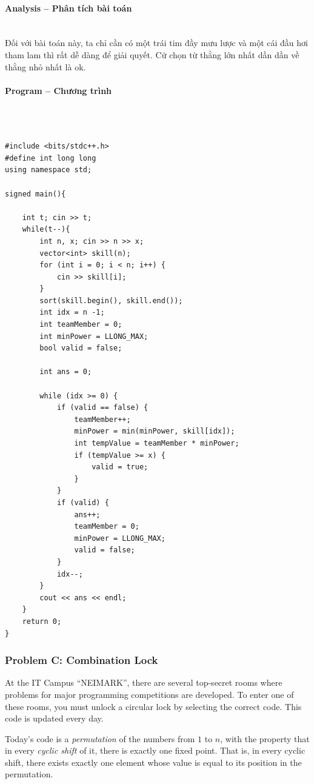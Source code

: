\documentclass{article}
\begin{document}
\paragraph{Analysis -- Phân tích bài toán} \mbox{} \\

Đối với bài toán này, ta chỉ cần có một trái tim đầy mưu lược và một cái đầu hơi tham lam thì rất dễ dàng để giải quyết. Cứ chọn từ thằng lớn nhất dần dần về thằng nhỏ nhất là ok.

\paragraph{Program -- Chương trình} \mbox{} \\

\begin{lstlisting}

#include <bits/stdc++.h>
#define int long long
using namespace std;

signed main(){

	int t; cin >> t;
	while(t--){
		int n, x; cin >> n >> x;
		vector<int> skill(n);
		for (int i = 0; i < n; i++) {
			cin >> skill[i];
		}
		sort(skill.begin(), skill.end());
		int idx = n -1;
		int teamMember = 0;
		int minPower = LLONG_MAX;
		bool valid = false;

		int ans = 0;

		while (idx >= 0) {
			if (valid == false) {
				teamMember++;
				minPower = min(minPower, skill[idx]);
				int tempValue = teamMember * minPower;
				if (tempValue >= x) {
					valid = true;
				}
			}
			if (valid) {
				ans++;
				teamMember = 0;
				minPower = LLONG_MAX;
				valid = false;
			}    
			idx--;
		}
		cout << ans << endl;
	}
	return 0;
}
\end{lstlisting}

\subsubsection{Problem C: Combination Lock}
At the IT Campus ``NEIMARK'', there are several top-secret rooms where problems for major programming competitions are developed. To enter one of these rooms, you must unlock a circular lock by selecting the correct code. This code is updated every day.

Today's code is a \textit{permutation} of the numbers from $1$ to $n$, with the property that in every \textit{cyclic shift} of it, there is exactly one fixed point. That is, in every cyclic shift, there exists exactly one element whose value is equal to its position in the permutation.
\end{document}
